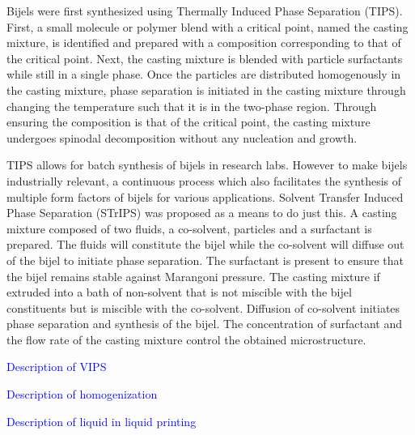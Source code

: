 Bijels were first synthesized using Thermally Induced Phase Separation (TIPS). \cite{herzig_bicontinuous_2007, lee_bicontinuous_2010, bai_dynamics_2015} First, a small molecule or polymer blend with a critical point, named the casting mixture, is identified and prepared with a composition corresponding to that of the critical point. Next, the casting mixture is blended with particle surfactants while still in a single phase. Once the particles are distributed homogenously in the casting mixture, phase separation is initiated in the casting mixture through changing the temperature such that it is in the two-phase region. Through ensuring the composition is that of the critical point, the casting mixture undergoes spinodal decomposition without any nucleation and growth. 

TIPS allows for batch synthesis of bijels in research labs. However to make bijels industrially relevant, a continuous process which also facilitates the synthesis of multiple form factors of bijels for various applications. Solvent Transfer Induced Phase Separation (STrIPS) was proposed as a means to do just this. A casting mixture composed of two fluids, a co-solvent, particles and a surfactant is prepared. The fluids will constitute the bijel while the co-solvent will diffuse out of the bijel to initiate phase separation. The surfactant is present to ensure that the bijel remains stable against Marangoni pressure. The casting mixture if extruded into a bath of non-solvent that is not miscible with the bijel constituents but is miscible with the co-solvent. Diffusion of co-solvent initiates phase separation and synthesis of the bijel. The concentration of surfactant and the flow rate of the casting mixture control the obtained microstructure. 

\textcolor{blue}{Description of VIPS}

\textcolor{blue}{Description of homogenization}

\textcolor{blue}{Description of liquid in liquid printing}


